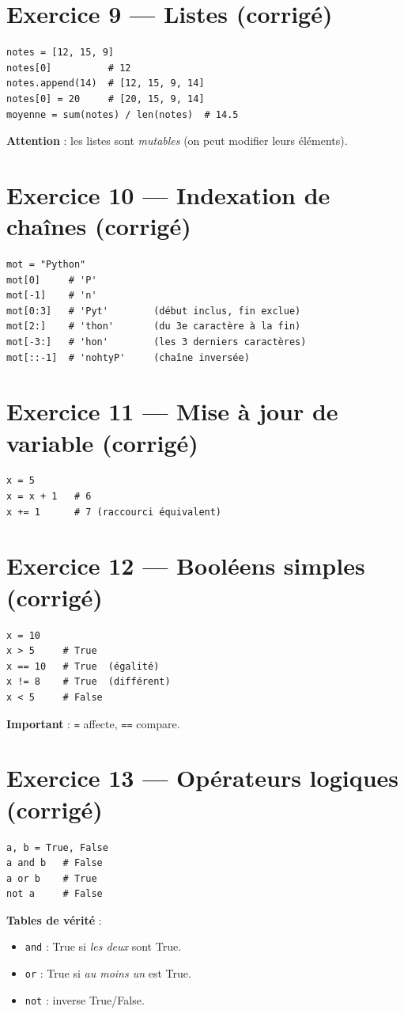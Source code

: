 \documentclass[11pt,a4paper]{article}
\begin{document}
\section*{Exercice 9 — Listes (corrigé)}
\begin{lstlisting}
notes = [12, 15, 9]
notes[0]          # 12
notes.append(14)  # [12, 15, 9, 14]
notes[0] = 20     # [20, 15, 9, 14]
moyenne = sum(notes) / len(notes)  # 14.5
\end{lstlisting}
\textbf{Attention} : les listes sont \emph{mutables} (on peut modifier leurs éléments).

\section*{Exercice 10 — Indexation de chaînes (corrigé)}
\begin{lstlisting}
mot = "Python"
mot[0]     # 'P'
mot[-1]    # 'n'
mot[0:3]   # 'Pyt'        (début inclus, fin exclue)
mot[2:]    # 'thon'       (du 3e caractère à la fin)
mot[-3:]   # 'hon'        (les 3 derniers caractères)
mot[::-1]  # 'nohtyP'     (chaîne inversée)
\end{lstlisting}

\section*{Exercice 11 — Mise à jour de variable (corrigé)}
\begin{lstlisting}
x = 5
x = x + 1   # 6
x += 1      # 7 (raccourci équivalent)
\end{lstlisting}

\section*{Exercice 12 — Booléens simples (corrigé)}
\begin{lstlisting}
x = 10
x > 5     # True
x == 10   # True  (égalité)
x != 8    # True  (différent)
x < 5     # False
\end{lstlisting}
\textbf{Important} : \texttt{=} affecte, \texttt{==} compare.

\section*{Exercice 13 — Opérateurs logiques (corrigé)}
\begin{lstlisting}
a, b = True, False
a and b   # False
a or b    # True
not a     # False
\end{lstlisting}
\textbf{Tables de vérité} :
\begin{itemize}
  \item \texttt{and} : True si \emph{les deux} sont True.
  \item \texttt{or}  : True si \emph{au moins un} est True.
  \item \texttt{not} : inverse True/False.
\end{itemize}
\end{document}
